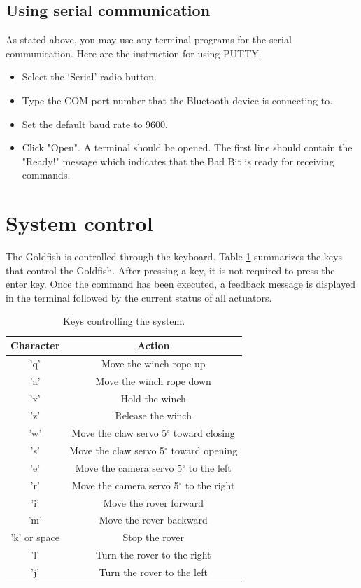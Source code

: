 \documentclass[letterpaper, 12 pt]{article}
\begin{document}
\subsection{Using serial communication}
As stated above, you may use any terminal programs for the serial communication. Here are the instruction for using PUTTY.
\begin{itemize}
\item Select the ‘Serial’ radio button.
\item Type the COM port number that the Bluetooth device is connecting to.
\item Set the default baud rate to 9600.
\item Click "Open". A terminal should be opened. The first line should contain the "Ready!" message which indicates that the Bad Bit is ready for receiving commands.
\end{itemize}
\section{System control}
The Goldfish is controlled through the keyboard. Table \ref{tab:keys} summarizes the keys that control the Goldfish. After pressing a key, it is not required to press the enter key. Once the command has been executed, a feedback message is displayed in the terminal followed by the current status of all actuators.
\begin{table}[h]
\begin{center}
\caption{Keys controlling the system.}
\label{tab:keys}
\vspace{0.5cm}
\begin{tabular}{|c|c|}
\hline
\textbf{Character} & \textbf{Action}\\
\hline
'q' & Move the winch rope up\\
\hline
'a' & Move the winch rope down\\
\hline
'x' & Hold the winch\\
\hline
'z' & Release the winch\\
\hline 
'w' & Move the claw servo 5$^{\circ}$ toward closing\\
\hline  
's' & Move the claw servo 5$^{\circ}$ toward opening\\
\hline
'e' & Move the camera servo 5$^{\circ}$ to the left\\
\hline  
'r' & Move the camera servo 5$^{\circ}$ to the right\\
\hline
'i' & Move the rover forward\\
\hline
'm' & Move the rover backward\\
\hline
'k' or space & Stop the rover\\
\hline
'l' & Turn the rover to the right\\
\hline
'j' & Turn the rover to the left\\
\hline

\end{tabular}
\end{center}
\end{table}
%

\end{document}
